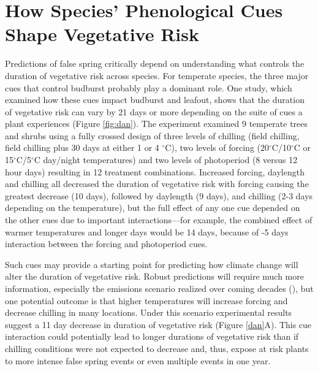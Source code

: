 \documentclass{article}\usepackage[]{graphicx}\usepackage[]{color}
\begin{document}
\section {How Species' Phenological Cues Shape Vegetative Risk}
Predictions of false spring critically depend on understanding what controls the duration of vegetative risk across species. For temperate species, the three major cues that control budburst \citep[e.g., low winter temperatures, warm spring temperatures, and increasing photoperiods]{Chuine2010} probably play a dominant role. One study, which examined how these cues impact budburst and leafout, shows that the duration of vegetative risk can vary by 21 days or more depending on the suite of cues a plant experiences (Figure \ref{fig:dan}). The experiment examined 9 temperate trees and shrubs using a fully crossed design of three levels of chilling (field chilling, field chilling plus 30 days at either 1 or 4 $^{\circ}$C), two levels of forcing (20$^{\circ}$C/10$^{\circ}$C or 15$^{\circ}$C/5$^{\circ}$C day/night temperatures) and two levels of photoperiod (8 versus 12 hour days) resulting in 12 treatment combinations. Increased forcing, daylength and chilling all decreased the duration of vegetative risk with forcing causing the greatest decrease (10 days), followed by daylength (9 days), and chilling (2-3 days depending on the temperature), but the full effect of any one cue depended on the other cues due to important interactions---for example, the combined effect of warmer temperatures and longer days would be 14 days, because of -5 days interaction between the forcing and photoperiod cues. 

Such cues may provide a starting point for predicting how climate change will alter the duration of vegetative risk. Robust predictions will require much more information, especially the emissions scenario realized over coming decades (\citep{IPCC2014}), but one potential outcome is that higher temperatures will increase forcing and decrease chilling in many locations. Under this scenario experimental results suggest a 11 day decrease in duration of vegetative risk (Figure \ref{dan}A). 
This cue interaction could potentially lead to longer durations of vegetative risk than if chilling conditions were not expected to decrease and, thus, expose at risk plants to more intense false spring events or even multiple events in one year. 
\end{document}

